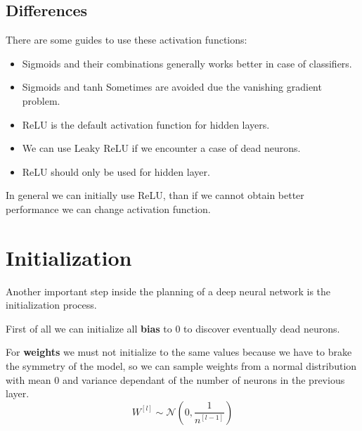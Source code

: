 \subsection{Differences}
There are some guides to use these activation functions:
\begin{itemize}
    \item Sigmoids and their combinations generally works better in case of classifiers.
    \item Sigmoids and tanh Sometimes are avoided due the vanishing gradient problem.
    \item ReLU is the default activation function for hidden layers.
    \item We can use Leaky ReLU if we encounter a case of dead neurons.
    \item ReLU should only be used for hidden layer.
\end{itemize}
In general we can initially use ReLU, than if we cannot obtain better performance
we can change activation function.

\section{Initialization}
Another important step inside the planning of a deep neural network is the 
initialization process.

First of all we can initialize all \textbf{bias} to $0$ to discover eventually 
dead neurons. %

For \textbf{weights} we must not initialize to the same values because we have to
brake the symmetry of the model, so we can sample weights from a normal 
distribution with mean $0$ and variance dependant of the number of neurons in 
the previous layer.
\begin{equation*}
    W^{[l]} \sim \mathcal{N}\left(0, \frac{1}{n^{[l-1]}}\right)
\end{equation*}
